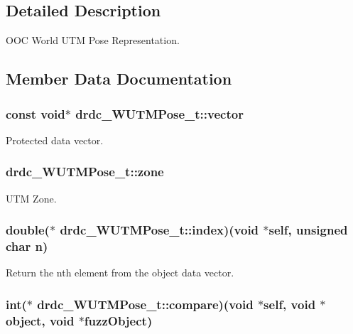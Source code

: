 \subsection{Detailed Description}
OOC World UTM Pose Representation. 



\subsection{Member Data Documentation}
\hypertarget{structdrdc__WUTMPose__t_043aefad0c7e8af8630dd883c00d2f9f}{
\subsubsection[vector]{\setlength{\rightskip}{0pt plus 5cm}const void$\ast$ {\bf drdc\_\-WUTMPose\_\-t::vector}}}
\label{structdrdc__WUTMPose__t_043aefad0c7e8af8630dd883c00d2f9f}


Protected data vector. 

\hypertarget{structdrdc__WUTMPose__t_a503d72607bcdbfd06eee395170ea3a3}{
\subsubsection[zone]{ {\bf drdc\_\-WUTMPose\_\-t::zone}}}
\label{structdrdc__WUTMPose__t_a503d72607bcdbfd06eee395170ea3a3}


UTM Zone. 

\hypertarget{structdrdc__WUTMPose__t_76525c671870dbad775b4df26018cd33}{
\subsubsection[index]{\setlength{\rightskip}{0pt plus 5cm}double($\ast$ {\bf drdc\_\-WUTMPose\_\-t::index})(void $\ast$self, unsigned char n)}}
\label{structdrdc__WUTMPose__t_76525c671870dbad775b4df26018cd33}


Return the nth element from the object data vector. 

\hypertarget{structdrdc__WUTMPose__t_e0f9e732d2e42856efaf5fb87f5e60c5}{
\subsubsection[compare]{\setlength{\rightskip}{0pt plus 5cm}int($\ast$ {\bf drdc\_\-WUTMPose\_\-t::compare})(void $\ast$self, void $\ast$object, void $\ast$fuzzObject)}}
\label{structdrdc__WUTMPose__t_e0f9e732d2e42856efaf5fb87f5e60c5}


